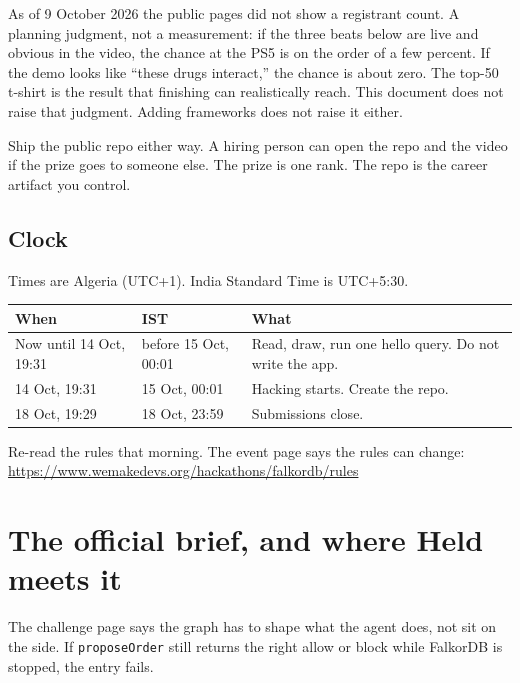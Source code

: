 \documentclass[11pt,a4paper]{article}
\newcommand{\code}[1]{\texttt{#1}}
\begin{document}
As of 9 October 2026 the public pages did not show a registrant count.
A planning judgment, not a measurement: if the three beats below are live and obvious in the video, the chance at the PS5 is on the order of a few percent.
If the demo looks like ``these drugs interact,'' the chance is about zero.
The top-50 t-shirt is the result that finishing can realistically reach.
This document does not raise that judgment. Adding frameworks does not raise it either.

Ship the public repo either way. A hiring person can open the repo and the video if the prize goes to someone else.
The prize is one rank. The repo is the career artifact you control.

\subsection{Clock}

Times are Algeria (UTC+1). India Standard Time is UTC+5:30.

\begin{center}
\begin{tabular}{@{}llp{7.2cm}@{}}
\toprule
\textbf{When} & \textbf{IST} & \textbf{What} \\
\midrule
Now until 14 Oct, 19:31 & before 15 Oct, 00:01 & Read, draw, run one hello query. Do not write the app. \\
14 Oct, 19:31 & 15 Oct, 00:01 & Hacking starts. Create the repo. \\
18 Oct, 19:29 & 18 Oct, 23:59 & Submissions close. \\
\bottomrule
\end{tabular}
\end{center}

Re-read the rules that morning. The event page says the rules can change:\\
\url{https://www.wemakedevs.org/hackathons/falkordb/rules}

\section{The official brief, and where Held meets it}

The challenge page says the graph has to shape what the agent does, not sit on the side.
If \code{proposeOrder} still returns the right allow or block while FalkorDB is stopped, the entry fails.
\end{document}
